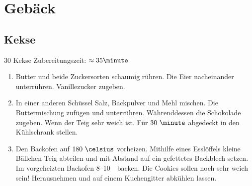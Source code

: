 \chapter{Gebäck}
\section{Kekse}
30 Kekse \hfill Zubereitungszeit: $\approx35 \minute$

\begin{enumerate}
\item	Butter und beide Zuckersorten schaumig rühren.
	Die Eier nacheinander unterrühren.
	Vanillezucker zugeben.
\item	In einer anderen Schüssel Salz, Backpulver und Mehl mischen.
	Die Buttermischung zufügen und unterrühren.
	Währenddessen die Schokolade zugeben.
	Wenn der Teig sehr weich ist.
	Für $30~\minute$ abgedeckt in den Kühlschrank stellen.
\item	Den Backofen auf $180~\celsius$ vorheizen.
	Mithilfe eines Esslöffels kleine Bällchen Teig abteilen und mit Abstand auf ein gefettetes Backblech setzen.
	Im vorgeheizten Backofen 8--10~\minute\ backen.
	Die Cookies sollen noch sehr weich sein!
	Herausnehmen und auf einem Kuchengitter abkühlen lassen.
\end{enumerate}

